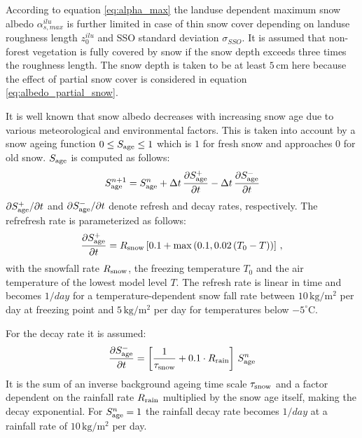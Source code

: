 \documentclass[a4paper,11pt]{article}
\begin{document}
According to equation \ref{eq:alpha_max} the landuse dependent maximum snow albedo $\alpha_{s,max}^{ilu}$ is further limited in case of thin snow cover 
depending on landuse roughness length $z_{0}^{ilu}$ and SSO standard deviation $\sigma_{SSO}$. It is assumed that non-forest
vegetation is fully covered by snow if the snow depth exceeds three times the roughness length. The snow depth is taken to be at least $5\,\mathrm{cm}$ 
here because the effect of partial snow cover is considered in equation \ref{eq:albedo_partial_snow}.

It is well known that snow albedo decreases with increasing snow age due to various meteorological and environmental factors. 
This is taken into account by a snow ageing function $0\leq S_{\rm age}\leq 1$ which is $1$ for fresh snow and approaches 0 for 
old snow. $S_{\rm age}$ is computed as follows:
\begin{align}
 S_{\rm age}^{n+1} = S_{\rm age}^{n} + \Delta t \, \frac{\partial S_{\rm age}^{+}}{\partial t} - \Delta t \, \frac{\partial S_{\rm age}^{-}}{\partial t}
\end{align}
$\partial S_{\rm age}^{+}/\partial t$ and $\partial S_{\rm age}^{-}/\partial t$ denote refresh and decay rates, respectively. 
The refrefresh rate is parameterized as follows:
\begin{align}
 \frac{\partial S_{\rm age}^{+}}{\partial t} = R_{\rm snow} \left[0.1 + \max\left(0.1, 0.02\,(T_{0}-T)\right)\right]\,,
\end{align}
with the snowfall rate $R_{\rm snow}$, the freezing temperature $T_{0}$ and the air temperature of the lowest model level $T$. 
The refresh rate is linear in time and becomes $1/day$ for a temperature-dependent snow fall rate between $10\,\mathrm{kg/m^{2}}$ 
per day at freezing point and $5\,\mathrm{kg/m^{2}}$ per day for temperatures below $-5^{\circ}\mathrm{C}$.

For the decay rate it is assumed:
\begin{align}
  \frac{\partial S_{\rm age}^{-}}{\partial t} = \left[\frac{1}{\tau_{\rm snow}} + 0.1\cdot  R_{\rm rain} \right]\, S_{\rm age}^{n}
\end{align}
It is the sum of an inverse background ageing time scale $\tau_{\rm snow}$ and a factor dependent on the rainfall rate $R_{\rm rain}$ 
multiplied by the snow age itself, making the decay exponential. For $S_{\rm age}^{n}=1$ the rainfall decay rate becomes $1/day$ at 
a rainfall rate of $10\,\mathrm{kg/m^{2}}$ per day.
\end{document}
